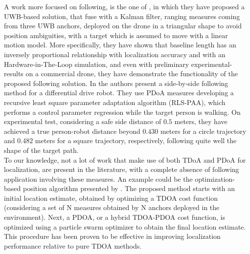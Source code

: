 A work more focused on following, is the one of \citet{Uwbbasedsol}, in which they have proposed a UWB-based solution, that fuse with a Kalman filter, ranging measures coming from three UWB anchors, deployed on the drone in a triangular shape to avoid position ambiguities, with a target which is assumed to move with a linear motion model. More specifically, they have shown that baseline length has an inversely proportional relationship with localization accuracy and with an Hardware-in-The-Loop simulation, and even with preliminary experimental-results on a commercial drone, they have demonstrate the functionality of the proposed following solution. In \cite{sidebyside} the authors present a side-by-side following method for a differential drive robot. They use PDoA measures developing a recursive least square parameter adaptation algorithm (RLS-PAA), which performs a control parameter regression while the target person is walking. On experimental test, considering a safe side distance of $0.5$ meters, they have achieved a true person-robot distance beyond $0.430$ meters for a circle trajectory and $0.482$ meters for a square trajectory, respectively, following quite well the shape of the target path.\\
To our knowledge, not a lot of work that make use of both TDoA and PDoA for localization, are present in the literature, with a complete absence of following application involving these measures. An example could be the optimization-based position algorithm presented by \citet{tdoapdoa_optim}. The proposed method starts with an initial location estimate, obtained by optimizing a TDOA cost function (considering a set of N measures obtained by N anchors deployed in the environment). Next, a PDOA, or a hybrid TDOA-PDOA cost function, is optimized using a particle swarm optimizer to obtain the final location estimate. This procedure has been proven to be effective in improving localization performance relative to pure TDOA methods.\\

